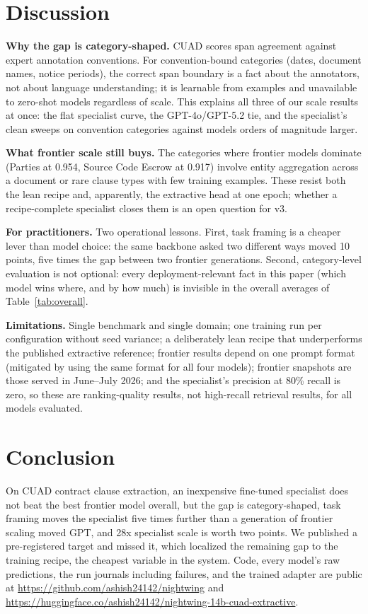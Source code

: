 \documentclass[11pt,letterpaper]{article}
\begin{document}
\section{Discussion}
\label{sec:discussion}

\textbf{Why the gap is category-shaped.} CUAD scores span agreement against
expert annotation conventions. For convention-bound categories (dates,
document names, notice periods), the correct span boundary is a fact about
the annotators, not about language understanding; it is learnable from
examples and unavailable to zero-shot models regardless of scale. This
explains all three of our scale results at once: the flat specialist curve,
the GPT-4o/GPT-5.2 tie, and the specialist's clean sweeps on convention
categories against models orders of magnitude larger.

\textbf{What frontier scale still buys.} The categories where frontier
models dominate (Parties at 0.954, Source Code Escrow at 0.917) involve
entity aggregation across a document or rare clause types with few training
examples. These resist both the lean recipe and, apparently, the extractive
head at one epoch; whether a recipe-complete specialist closes them is an
open question for v3.

\textbf{For practitioners.} Two operational lessons. First, task framing is
a cheaper lever than model choice: the same backbone asked two different ways
moved 10 points, five times the gap between two frontier generations.
Second, category-level evaluation is not optional: every deployment-relevant
fact in this paper (which model wins where, and by how much) is invisible in
the overall averages of Table~\ref{tab:overall}.

\textbf{Limitations.} Single benchmark and single domain; one training run
per configuration without seed variance; a deliberately lean recipe that
underperforms the published extractive reference; frontier results depend on
one prompt format (mitigated by using the same format for all four models);
frontier snapshots are those served in June--July 2026; and the specialist's
precision at 80\% recall is zero, so these are ranking-quality results, not
high-recall retrieval results, for all models evaluated.

\section{Conclusion}

On CUAD contract clause extraction, an inexpensive fine-tuned specialist
does not beat the best frontier model overall, but the gap is
category-shaped, task framing moves the specialist five times further than a
generation of frontier scaling moved GPT, and 28x specialist scale is worth
two points. We published a pre-registered target and missed it, which
localized the remaining gap to the training recipe, the cheapest variable in
the system. Code, every model's raw predictions, the run journals including
failures, and the trained adapter are public at
\url{https://github.com/ashish24142/nightwing} and
\url{https://huggingface.co/ashish24142/nightwing-14b-cuad-extractive}.
\end{document}
